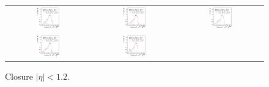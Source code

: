 \begin{figure}[ht]
\begin{tabular}{ccc}
    \includegraphics[width=0.3\textwidth]{figures/ResFit_Spring10QCDFlat_CB_Eta0_MCClosure_PtBin6} &
    \includegraphics[width=0.3\textwidth]{figures/ResFit_Spring10QCDFlat_CB_Eta0_MCClosure_PtBin7} &
    \includegraphics[width=0.3\textwidth]{figures/ResFit_Spring10QCDFlat_CB_Eta0_MCClosure_PtBin8} \\

    \includegraphics[width=0.3\textwidth]{figures/ResFit_Spring10QCDFlat_CB_Eta0_MCClosure_PtBin9} &
    \includegraphics[width=0.3\textwidth]{figures/ResFit_Spring10QCDFlat_CB_Eta0_MCClosure_PtBin10} & \\
  \end{tabular}
\caption{Closure \mbox{$|\eta|<1.2$}.}
\label{fig:ResFit:App:CB:MCClosure}
\end{figure}

\clearpage
